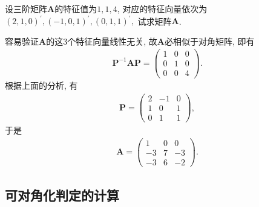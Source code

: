 \documentclass[../../main.tex]{subfiles}
\begin{document}
\begin{example}
设三阶矩阵\(\boldsymbol{A}\)的特征值为\(1,1,4\), 对应的特征向量依次为
\((2,1,0)^{\prime},(-1,0,1)^{\prime},(0,1,1)^{\prime},\)
试求矩阵\(\boldsymbol{A}\).
\end{example}
\begin{solution}
容易验证\(\boldsymbol{A}\)的这\(3\)个特征向量线性无关, 故\(\boldsymbol{A}\)必相似于对角矩阵, 即有
\begin{align*}
\boldsymbol{P}^{-1}\boldsymbol{AP}=\begin{pmatrix}
1&0&0\\
0&1&0\\
0&0&4
\end{pmatrix}.
\end{align*}
根据上面的分析, 有
\begin{align*}
\boldsymbol{P}=\begin{pmatrix}
2&-1&0\\
1&0&1\\
0&1&1
\end{pmatrix},
\end{align*}
于是
\begin{align*}
\boldsymbol{A}=\begin{pmatrix}
1&0&0\\
-3&7&-3\\
-3&6&-2
\end{pmatrix}. 
\end{align*} 
\end{solution}

\subsection{可对角化判定的计算}
\end{document}
